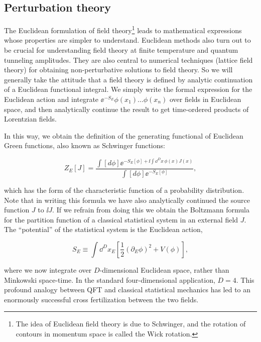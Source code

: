 \subsection{Perturbation theory}

The Euclidean formulation of field theory\footnote[7]{The idea of Euclidean field theory is due to Schwinger, and the rotation of contours in momentum space is called the Wick rotation.} leads to mathematical expressions whose properties are simpler to understand.
Euclidean methods also turn out to be crucial for understanding field theory at finite
temperature and quantum tunneling amplitudes. They are also central to numerical
techniques (lattice field theory) for obtaining non-perturbative solutions to field theory.
So we will generally take the attitude that a field theory is defined by analytic continuation
of a Euclidean functional integral. We simply write the formal expression for the Euclidean
action and integrate $\ee^{-S_E}\phi(x_1)\ldots\phi(x_n)$ over fields in Euclidean space, and then
analytically continue the result to get time-ordered products of Lorentzian fields.

In this way, we obtain the definition of the generating functional of Euclidean Green
functions, also known as Schwinger functions:

\begin{equation}
Z_E[J]=\frac{\int[d\phi]\ee^{-S_E[\phi]+\ii\int\dd^D x\,\phi(x)J(x)}}{\int[d\phi]\ee^{-S_E[\phi]}},
\label{eq:3.24}
\end{equation}

which has the form of the characteristic function of a probability distribution. Note
that in writing this formula we have also analytically continued the source function $J$
to $\ii J$. If we refrain from doing this we obtain the Boltzmann formula for the partition
function of a classical statistical system in an external field $J$. The ``potential'' of the
statistical system is the Euclidean action,

\begin{equation}
S_E\equiv\int\dd^D x_E\left[\frac12(\partial_E\phi)^2+V(\phi)\right],
\label{eq:3.25}
\end{equation}

where we now integrate over $D$-dimensional Euclidean space, rather than Minkowski
space-time. In the standard four-dimensional application, $D=4$. This profound analogy between QFT and classical statistical mechanics has
led to an enormously successful cross fertilization between the two fields.

